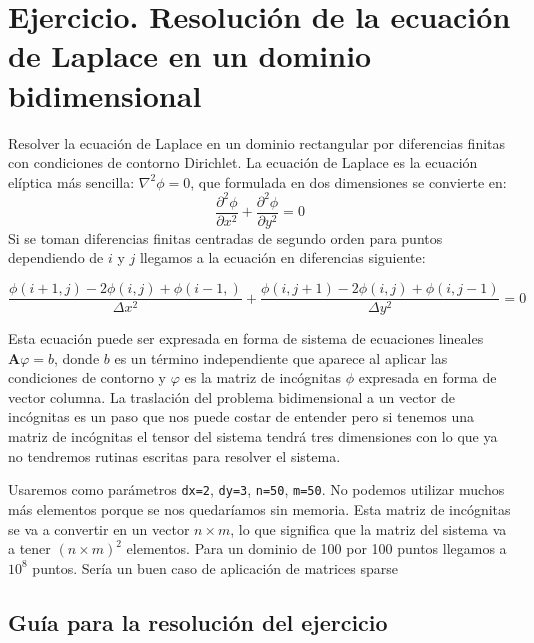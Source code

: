 \section{Ejercicio\label{sec:Ejercicio-Laplace}.  Resolución de la
  ecuación de Laplace en un dominio bidimensional}

Resolver la ecuación de Laplace en un dominio rectangular por
diferencias finitas con condiciones de contorno Dirichlet. La ecuación
de Laplace es la ecuación elíptica más sencilla: $\nabla^{2}\phi=0$,
que formulada en dos dimensiones se convierte en:\[
\frac{\partial^{2}\phi}{\partial
  x^{2}}+\frac{\partial^{2}\phi}{\partial y^{2}}=0\] Si se toman
diferencias finitas centradas de segundo orden para puntos dependiendo
de $i$ y $j$ llegamos a la ecuación en diferencias siguiente:

$$\frac{\phi(i+1,j)-2\phi(i,j)+\phi(i-1,)}{\Delta
  x^{2}}+\frac{\phi(i,j+1)-2\phi(i,j)+\phi(i,j-1)}{\Delta y^{2}}=0$$

Esta ecuación puede ser expresada en forma de sistema de ecuaciones
lineales $\mathbf{A}\varphi=b$, donde $b$ es un término independiente
que aparece al aplicar las condiciones de contorno y $\varphi$ es la
matriz de incógnitas $\phi$ expresada en forma de vector columna.  La
traslación del problema bidimensional a un vector de incógnitas es un
paso que nos puede costar de entender pero si tenemos una matriz de
incógnitas el tensor del sistema tendrá tres dimensiones con lo que ya
no tendremos rutinas escritas para resolver el sistema.

Usaremos como parámetros \texttt{dx=2}, \texttt{dy=3}, \texttt{n=50},
\texttt{m=50}. No podemos utilizar muchos más elementos porque se nos
quedaríamos sin memoria. Esta matriz de incógnitas se va a convertir
en un vector $n\times m$, lo que significa que la matriz del sistema
va a tener $(n\times m)^{2}$ elementos. Para un dominio de 100 por 100
puntos llegamos a $10^{8}$ puntos. Sería un buen caso de aplicación de
matrices sparse


\subsection{Guía para la resolución del ejercicio}

